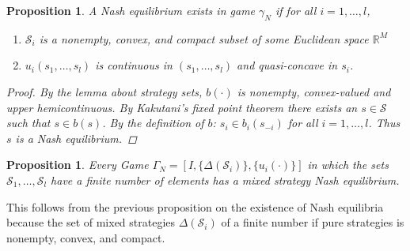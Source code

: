 \documentclass[12pt]{extreport} %
\theoremstyle{named}
\theoremstyle{itshape}
\theoremstyle{normal}
\newtheorem{proposition}[unnamedtheorem]{Proposition}
\begin{document}
\begin{proposition}
	A Nash equilibrium exists in game $\gamma_N$ if for all $i = 1, \dotsc, l$,
	\begin{enumerate}
		\item $\mathcal{S}_i$ is a nonempty, convex, and compact subset of some Euclidean space $\mathbb{R}^M$
		\item $u_i(s_1, \dotsc, s_l)$ is continuous in $(s_1, \dotsc, s_l)$ and quasi-concave in $s_i$.
	\end{enumerate}
	
	\begin{proof}
		By the lemma about strategy sets, $b(\cdot)$ is nonempty, convex-valued and upper hemicontinuous. By Kakutani's fixed point theorem there exists an $s \in \mathcal{S}$ such that $s \in b(s)$. By the definition of $b$: $s_i \in b_i(s_{-i})$ for all $i = 1, \dotsc, l$. Thus $s$ is a Nash equilibrium.
	\end{proof}
\end{proposition} 

\begin{proposition}
	Every Game $\Gamma_N = \left[ I, \{ \Delta(\mathcal{S}_i) \}, \{u_i(\cdot)\} \right]$ in which the sets $\mathcal{S}_1, \dotsc, \mathcal{S}_l$ have a finite number of elements has a mixed strategy Nash equilibrium.
\end{proposition}

This follows from the previous proposition on the existence of Nash equilibria because the set of mixed strategies $\Delta(\mathcal{S}_i)$ of a finite number if pure strategies is nonempty, convex, and compact.
\end{document}
